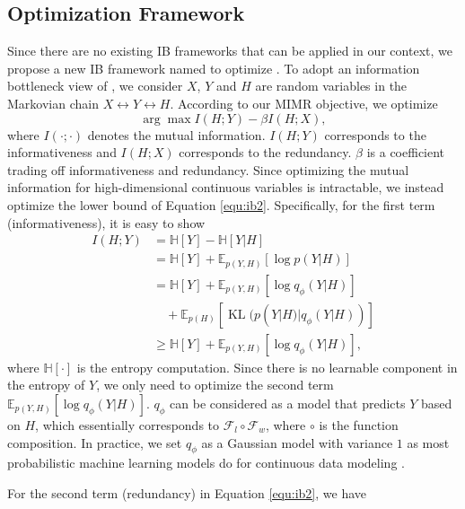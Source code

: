 \subsection{Optimization Framework}
 Since there are no existing IB frameworks that can be applied in our context, we propose a new IB framework named \multiheadname{} to optimize \hybrid{}. To adopt an information bottleneck view of \hybrid{}, we consider $X$, $Y$ and $H$ are random variables in the Markovian chain $X \leftrightarrow Y \leftrightarrow H$. According to our MIMR objective, we optimize
\begin{equation}
\label{equ:ib2}
    \arg \max I(H; Y) - \beta I(H; X),
\end{equation}
where $I(\cdot ; \cdot)$ denotes the mutual information. $I(H; Y)$ corresponds to the informativeness and $I(H; X)$ corresponds to the redundancy. $\beta$ is a coefficient trading off informativeness and redundancy. Since optimizing the mutual information for high-dimensional continuous variables is intractable, we instead optimize the lower bound of Equation \ref{equ:ib2}. Specifically, for the first term (informativeness), it is easy to show
\begin{equation}
\label{equ:lowerbound}
\begin{aligned}
    I(H; Y) &= \mathbb{H}[Y] -  \mathbb{H}[{Y|H}] \\
    &=\mathbb{H}[Y] + \mathbb{E}_{p(Y, H)}[\log p(Y|H)] \\
    & = \mathbb{H}[Y] + \mathbb{E}_{p(Y, H)}[\log q_\phi(Y|H)] \\
    &\quad + \mathbb{E}_{p(H)}[\operatorname{KL}(p(Y|H)|q_\phi(Y|H))] \\
   & \geq \mathbb{H}[Y] + \mathbb{E}_{p(Y, H)}[\log q_\phi(Y|H)],
\end{aligned}
\end{equation}
where $\mathbb{H}[\cdot]$ is the entropy computation.
Since there is no learnable component in the entropy of $Y$, we only need to optimize the second term $\mathbb{E}_{p(Y, H)}[\log q_\phi(Y|H)]$. $q_\phi$ can be considered as a model that predicts $Y$ based on $H$, which essentially corresponds to $\mathcal{F}_l \circ \mathcal{F}_w$, where $\circ$ is the function composition. In practice, we set $q_\phi$ as a Gaussian model with variance $1$ as most probabilistic machine learning models do for continuous data modeling \citep{alemi2016deep,luo2019significance,peng2018variational,kingma2013auto}. 


For the second term (redundancy) in Equation \ref{equ:ib2}, we have

